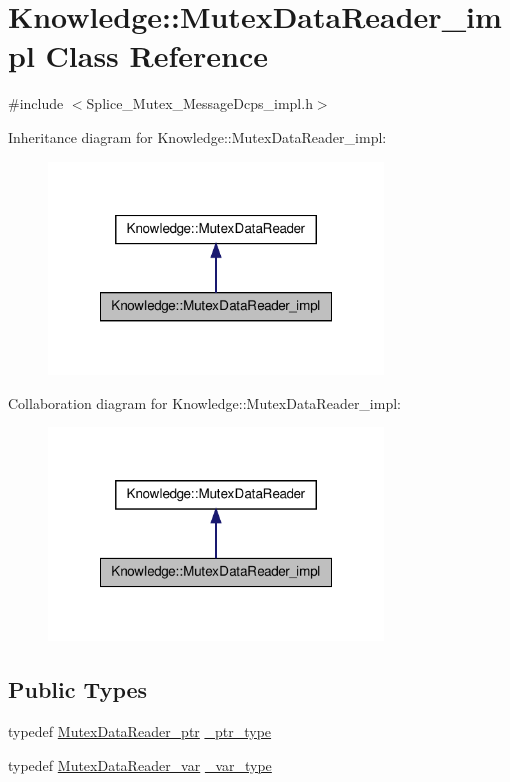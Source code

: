 \hypertarget{classKnowledge_1_1MutexDataReader__impl}{
\section{Knowledge::MutexDataReader\_\-impl Class Reference}
\label{d7/dde/classKnowledge_1_1MutexDataReader__impl}
}


{\ttfamily \#include $<$Splice\_\-Mutex\_\-MessageDcps\_\-impl.h$>$}



Inheritance diagram for Knowledge::MutexDataReader\_\-impl:
\nopagebreak
\begin{figure}[H]
\begin{center}
\leavevmode
\includegraphics[width=252pt]{d7/de3/classKnowledge_1_1MutexDataReader__impl__inherit__graph}
\end{center}
\end{figure}


Collaboration diagram for Knowledge::MutexDataReader\_\-impl:
\nopagebreak
\begin{figure}[H]
\begin{center}
\leavevmode
\includegraphics[width=252pt]{d1/d04/classKnowledge_1_1MutexDataReader__impl__coll__graph}
\end{center}
\end{figure}
\subsection*{Public Types}
\begin{DoxyCompactItemize}
\item 
typedef \hyperlink{classKnowledge_1_1MutexDataReader}{MutexDataReader\_\-ptr} \hyperlink{classKnowledge_1_1MutexDataReader_a6ce4984d18dc73062308b9481f58d1d9}{\_\-ptr\_\-type}
\item 
typedef \hyperlink{namespaceKnowledge_a1af3d1f19c7cf91384b3fb2a37b3258b}{MutexDataReader\_\-var} \hyperlink{classKnowledge_1_1MutexDataReader_a2105a46860f8e7bf371ca6275bcdc8b4}{\_\-var\_\-type}
\end{DoxyCompactItemize}
